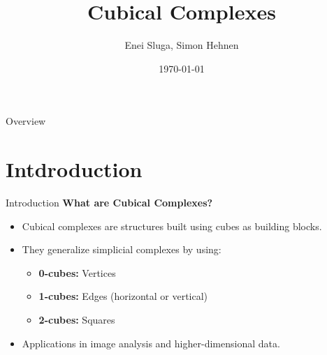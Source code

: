 \documentclass[aspectratio=169,xcolor=dvipsnames]{beamer}
\title{Cubical Complexes}
\subtitle{}
\author{Enei Sluga, Simon Hehnen}
\institute
{
    Faculty of Computer and Information Science \\
    University of Ljubljana %
}
\date{\today} %
\begin{document}
\begin{frame}
    \titlepage
\end{frame}

\begin{frame}{Overview}
    \tableofcontents
\end{frame}

\section{Intdroduction}


\begin{frame}{Introduction}
    \textbf{What are Cubical Complexes?}
    \begin{itemize}
        \item Cubical complexes are structures built using cubes as building blocks.
        \item They generalize simplicial complexes by using:
        \begin{itemize}
            \item \textbf{0-cubes:} Vertices
            \item \textbf{1-cubes:} Edges (horizontal or vertical)
            \item \textbf{2-cubes:} Squares
        \end{itemize}
        \item Applications in image analysis and higher-dimensional data.
    \end{itemize}
\end{frame}
\end{document}
